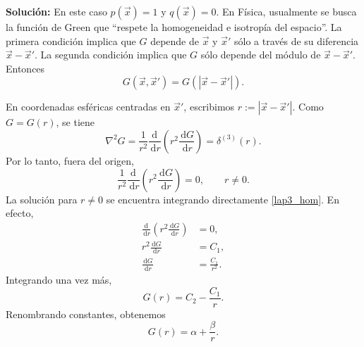 \documentclass[11pt]{article}
\newcommand{\dd}{\,\mathrm{d}}
\begin{document}
\textbf{Solución:} En este caso $p(\vec{x})=1$ y $q(\vec{x})=0$. En Física, usualmente se busca la función de Green que ``respete la homogeneidad e isotropía del espacio''. La primera condición implica que $G$ depende de $\vec{x}$ y $\vec{x}'$ sólo a través de su diferencia $\vec{x}-\vec{x}'$. La segunda condición implica que $G$ sólo depende del módulo de $\vec{x}-\vec{x}'$. Entonces
\begin{equation}
G(\vec{x},\vec{x}')=G(|\vec{x}-\vec{x}'|).
\end{equation}

En coordenadas esféricas centradas en $\vec{x}'$, escribimos $r:=|\vec{x}-\vec{x}'|$. Como $G=G(r)$, se tiene
\begin{equation}\label{n2Gd}
\nabla^2G=\frac{1}{r^2}\frac{\dd\ }{\dd r}\left(r^2\frac{\dd G}{\dd r}\right)=\delta^{(3)}(r).
\end{equation}
Por lo tanto, fuera del origen,
\begin{equation}\label{lap3_hom}
\frac{1}{r^2}\frac{\dd\ }{\dd r}\left(r^2\frac{\dd G}{\dd r}\right)=0,\qquad r\neq 0.
\end{equation}
La solución para $r\neq 0$ se encuentra integrando directamente \eqref{lap3_hom}. En efecto,
\begin{align*}
\frac{\dd\ }{\dd r}\left(r^2\frac{\dd G}{\dd r}\right)&=0,\\
r^2\frac{\dd G}{\dd r}&=C_1,\\
\frac{\dd G}{\dd r}&=\frac{C_1}{r^2}.
\end{align*}
Integrando una vez más,
\begin{equation*}
G(r)=C_2-\frac{C_1}{r}.
\end{equation*}
Renombrando constantes, obtenemos
\begin{equation}\label{lap3_general}
G(r)=\alpha+\frac{\beta}{r}.
\end{equation}
\end{document}
